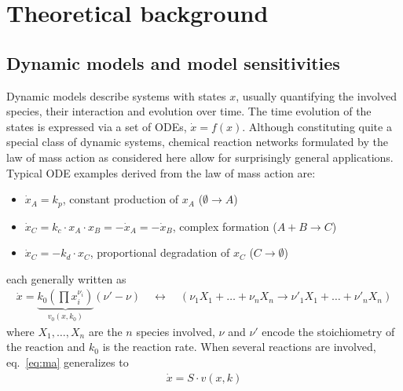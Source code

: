 \documentclass[article]{jss}
\begin{document}



\section{Theoretical background}
\label{sec:theory}

\subsection{Dynamic models and model sensitivities}
Dynamic models describe systems with states $x$, usually quantifying the involved species, their interaction and evolution over time. %
The time evolution of the states is expressed via a set of ODEs, $\dot x = f(x)$. Although constituting quite a special class of dynamic systems, chemical reaction networks formulated by the law of mass action as considered here allow for surprisingly general applications. Typical ODE examples derived from the law of mass action are:
\begin{itemize}
	\item $\dot x_A = k_p$, constant production of $x_A$ ($\emptyset \rightarrow A$)
	\item $\dot x_C = k_c \cdot x_A \cdot x_B = - \dot x_A = - \dot x_B$, complex formation ($A+B \rightarrow C$)
	\item $\dot x_C = - k_d \cdot x_C$, proportional degradation of $x_C$ ($C \rightarrow \emptyset$)
\end{itemize}
each generally written as
\begin{align}
	\dot x = \underbrace{k_0 \left(\prod x_i^{\nu_i}\right)}_{v_0(x, k_0)} (\nu' - \nu) \quad\leftrightarrow\quad (\nu_1 X_1 + \dots + \nu_n X_n \longrightarrow \nu'_1 X_1 + \dots + \nu'_n X_n)
	\label{eq:ma}
\end{align}
where $X_1, \dots, X_n$ are the $n$ species involved, $\nu$ and $\nu'$ encode the stoichiometry of the reaction and $k_0$ is the reaction rate. When several reactions are involved, eq.~\eqref{eq:ma} generalizes to
\begin{align}
	\dot x = S\cdot v(x, k)
	\label{eq:Sv}
\end{align}
\end{document}
